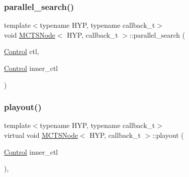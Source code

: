 \mbox{\label{class_m_c_t_s_node_a3053a6c46cf2205879c555ddc3936be9}} 
\subsubsection{\texorpdfstring{parallel\+\_\+search()}{parallel\_search()}}
{\footnotesize\ttfamily template$<$typename H\+YP, typename callback\+\_\+t$>$ \\
void \hyperlink{class_m_c_t_s_node}{M\+C\+T\+S\+Node}$<$ H\+YP, callback\+\_\+t $>$\+::parallel\+\_\+search (\begin{DoxyParamCaption}\item[{\hyperlink{struct_control}{Control}}]{ctl,  }\item[{\hyperlink{struct_control}{Control}}]{inner\+\_\+ctl }\end{DoxyParamCaption})\hspace{0.3cm}{\ttfamily [inline]}}

\mbox{\label{class_m_c_t_s_node_aee6d20621c57a00b8abe0ef4f7d0ee8c}} 
\subsubsection{\texorpdfstring{playout()}{playout()}}
{\footnotesize\ttfamily template$<$typename H\+YP, typename callback\+\_\+t$>$ \\
virtual void \hyperlink{class_m_c_t_s_node}{M\+C\+T\+S\+Node}$<$ H\+YP, callback\+\_\+t $>$\+::playout (\begin{DoxyParamCaption}\item[{\hyperlink{struct_control}{Control}}]{inner\+\_\+ctl }\end{DoxyParamCaption})\hspace{0.3cm}{\ttfamily [inline]}, {\ttfamily [virtual]}}

\mbox{\label{class_m_c_t_s_node_ae672141481eb0da89defec2c562b95e1}} 
